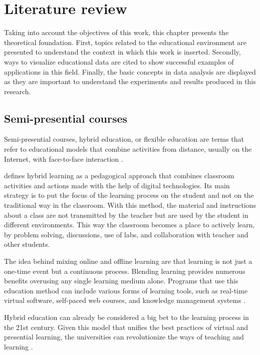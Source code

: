 \chapter{Literature review}
\label{ch:Literature}

Taking into account the objectives of this work, this chapter presents the theoretical foundation. First, topics related to the educational environment are presented to understand the context in which this work is inserted. Secondly, ways to visualize educational data are cited to show successful examples of applications in this field. Finally, the basic concepts in data analysis are displayed as they are important to understand the experiments and results produced in this research.

\section{Semi-presential courses}

Semi-presential courses, hybrid education, or flexible education are terms that refer to educational models that combine activities from distance, usually on the Internet, with face-to-face interaction \cite{camilloo2010interaccao}.

\cite{bacich2015ensino} defines hybrid learning as a pedagogical approach that combines classroom activities and actions made with the help of digital technologies. Its main strategy is to put the focus of the learning process on the student and not on the traditional way in the classroom. With this method, the material and instructions about a class are not transmitted by the teacher but are used by the student in different environments. This way the classroom becomes a place to actively learn, by problem solving, discussions, use of labs, and collaboration with teacher and other students.

The idea behind mixing online and offline learning are that learning is not just a one-time event but a continuous process. Blending learning provides numerous benefits overusing any single learning medium alone. Programs that use this education method can include various forms of learning tools, such as real-time virtual software, self-paced web courses, and knowledge management systems \cite{singh2021building}.

Hybrid education can already be considered a big bet to the learning process in the 21st century. Given this model that unifies the best practices of virtual and presential learning, the universities can revolutionize the ways of teaching and learning \cite{de2021ensino}.


